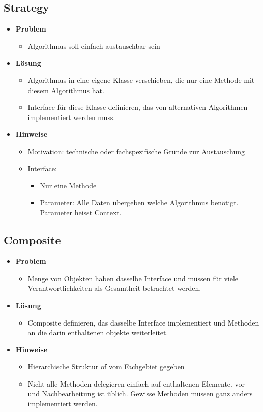\documentclass[../ZF_SWEN1.tex]{subfiles}
\begin{document}
\subsection{Strategy}
\begin{itemize}
	\item \textbf{Problem}
	\begin{itemize}
		\item Algorithmus soll einfach austauschbar sein
	\end{itemize}
	\item \textbf{Lösung}
	\begin{itemize}
		\item Algorithmus in eine eigene Klasse verschieben, die nur eine Methode mit diesem Algorithmus hat.
		\item Interface für diese Klasse definieren, das von alternativen Algorithmen implementiert werden muss.
	\end{itemize}
	\item \textbf{Hinweise}
	\begin{itemize}
		\item Motivation: technische oder fachspezifische Gründe zur Austauschung
		\item Interface:
		\begin{itemize}
			\item Nur eine Methode
			\item Parameter: Alle Daten übergeben welche Algorithmus benötigt. Parameter heisst Context.
		\end{itemize}
	\end{itemize}
\end{itemize}



\subsection{Composite}
\begin{itemize}
	\item \textbf{Problem}
	\begin{itemize}
		\item Menge von Objekten haben dasselbe Interface und müssen für viele Verantwortlichkeiten als Gesamtheit betrachtet werden.
	\end{itemize}
	\item \textbf{Lösung}
	\begin{itemize}
		\item Composite definieren, das dasselbe Interface implementiert und Methoden an die darin enthaltenen objekte weiterleitet.
	\end{itemize}
	\item \textbf{Hinweise}
	\begin{itemize}
		\item Hierarchische Struktur of vom Fachgebiet gegeben
		\item Nicht alle Methoden delegieren einfach auf enthaltenen Elemente. vor- und Nachbearbeitung ist üblich. Gewisse Methoden müssen ganz anders implementiert werden.
	\end{itemize}
\end{itemize}
\end{document}
